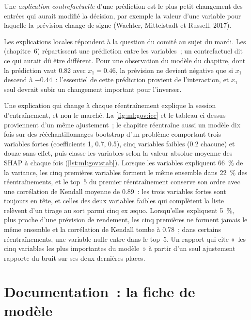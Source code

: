 \begin{definition}\label{def:ml:interpretability-and-model-governance:cf}
Une \emph{explication contrefactuelle} d'une prédiction est le plus petit changement des entrées qui
aurait modifié la décision, par exemple la valeur d'une variable pour laquelle la prévision change de signe (Wachter,
Mittelstadt et Russell, 2017).
\end{definition}

Les explications locales répondent à la question du comité au sujet du mardi. Les  (chapitre~6) répartissent une prédiction entre les
variables~; un contrefactuel dit ce qui aurait dû être différent. Pour une observation du modèle du chapitre, dont la
prédiction vaut 0.82 avec $x_1 = 0.46$, la prévision ne devient négative que si $x_1$ descend à $-0.44$~: l'essentiel de cette prédiction
provient de l'interaction, et $x_1$ seul devrait subir un changement important pour l'inverser.

Une explication qui change à chaque réentraînement explique la session d'entraînement, et non le marché. La \cref{fig:ml:gov:ice} et le
tableau ci-dessus proviennent d'un même ajustement~; le chapitre réentraîne aussi un modèle dix fois sur des rééchantillonnages bootstrap d'un problème comportant trois
variables fortes (coefficients 1, 0.7, 0.5), cinq variables faibles (0.2 chacune) et douze sans effet, puis classe les variables selon la
valeur absolue moyenne des SHAP à chaque fois (\cref{lst:ml:gov:stab}). Lorsque les variables expliquent 66~\% de la variance, les cinq
premières variables forment le même ensemble dans 22~\% des réentraînements, et le top~5 du premier réentraînement conserve son ordre avec une
corrélation de Kendall moyenne de 0.89~: les trois variables fortes sont toujours en tête, et celles des deux variables faibles qui complètent la liste relèvent d'un tirage au sort
parmi cinq ex æquo. Lorsqu'elles expliquent 5~\%, plus proche d'une prévision de rendement, les cinq premières ne forment jamais le même ensemble et la
corrélation de Kendall tombe à 0.78~; dans certains réentraînements, une variable nulle entre dans le top~5. Un rapport qui cite «~les cinq variables les plus
importantes du modèle~» à partir d'un seul ajustement rapporte du bruit sur ses deux dernières places.

\section{Documentation~: la fiche de modèle}

